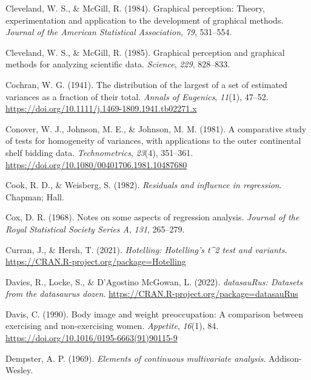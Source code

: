 \documentclass[
  letterpaper,
  10pt,
  krantz2]{krantz}
\newlength{\cslhangindent}
\newlength{\cslentryspacingunit} %
\newenvironment{CSLReferences}[2] %
 {%
  \setlength{\parindent}{0pt}
  \ifodd #1
  \let\oldpar\par
  \def\par{\hangindent=\cslhangindent\oldpar}
  \fi
  \setlength{\parskip}{#2\cslentryspacingunit}
 }%
 {}
\begin{document}
\begin{CSLReferences}{1}{0}
\leavevmode{}%
Cleveland, W. S., \& McGill, R. (1984). Graphical perception: Theory,
experimentation and application to the development of graphical methods.
\emph{Journal of the American Statistical Association}, \emph{79},
531--554.

\leavevmode{}%
Cleveland, W. S., \& McGill, R. (1985). Graphical perception and
graphical methods for analyzing scientific data. \emph{Science},
\emph{229}, 828--833.

\leavevmode{}%
Cochran, W. G. (1941). The distribution of the largest of a set of
estimated variances as a fraction of their total. \emph{Annals of
Eugenics}, \emph{11}(1), 47--52.
\url{https://doi.org/10.1111/j.1469-1809.1941.tb02271.x}

\leavevmode{}%
Conover, W. J., Johnson, M. E., \& Johnson, M. M. (1981). A comparative
study of tests for homogeneity of variances, with applications to the
outer continental shelf bidding data. \emph{Technometrics},
\emph{23}(4), 351--361.
\url{https://doi.org/10.1080/00401706.1981.10487680}

\leavevmode{}%
Cook, R. D., \& Weisberg, S. (1982). \emph{Residuals and influence in
regression}. Chapman; Hall.

\leavevmode{}%
Cox, D. R. (1968). Notes on some aspects of regression analysis.
\emph{Journal of the Royal Statistical Society Series A}, \emph{131},
265--279.

\leavevmode{}%
Curran, J., \& Hersh, T. (2021). \emph{Hotelling: Hotelling's t\^{}2
test and variants}. \url{https://CRAN.R-project.org/package=Hotelling}

\leavevmode{}%
Davies, R., Locke, S., \& D'Agostino McGowan, L. (2022).
\emph{datasauRus: Datasets from the datasaurus dozen}.
\url{https://CRAN.R-project.org/package=datasauRus}

\leavevmode{}%
Davis, C. (1990). Body image and weight preoccupation: A comparison
between exercising and non-exercising women. \emph{Appetite},
\emph{16}(1), 84. \url{https://doi.org/10.1016/0195-6663(91)90115-9}

\leavevmode{}%
Dempster, A. P. (1969). \emph{Elements of continuous multivariate
analysis}. Addison-Wesley.


\end{CSLReferences}
\end{document}
